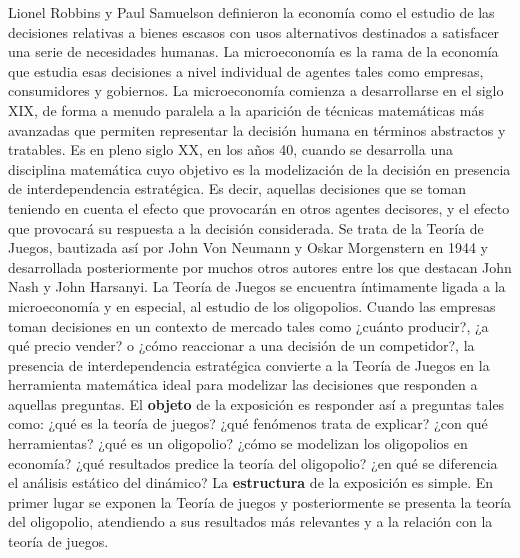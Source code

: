 \documentclass{nuevotema}
\begin{document}
\ideaclave

Lionel Robbins y Paul Samuelson definieron la economía como el estudio de las decisiones relativas a bienes escasos con usos alternativos destinados a satisfacer una serie de necesidades humanas. La microeconomía es la rama de la economía que estudia esas decisiones a nivel individual de agentes tales como empresas, consumidores y gobiernos. La microeconomía comienza a desarrollarse en el siglo XIX, de forma a menudo paralela a la aparición de técnicas matemáticas más avanzadas que permiten representar la decisión humana en términos abstractos y tratables. Es en pleno siglo XX, en los años 40, cuando se desarrolla una disciplina matemática cuyo objetivo es la modelización de la decisión en presencia de interdependencia estratégica. Es decir, aquellas decisiones que se toman teniendo en cuenta el efecto que provocarán en otros agentes decisores, y el efecto que provocará su respuesta a la decisión considerada. Se trata de la Teoría de Juegos, bautizada así por John Von Neumann y Oskar Morgenstern en 1944 y desarrollada posteriormente por muchos otros autores entre los que destacan John Nash y John Harsanyi. La Teoría de Juegos se encuentra íntimamente ligada a la microeconomía y en especial, al estudio de los oligopolios. Cuando las empresas toman decisiones en un contexto de mercado tales como ¿cuánto producir?, ¿a qué precio vender? o ¿cómo reaccionar a una decisión de un competidor?, la presencia de interdependencia estratégica convierte a la Teoría de Juegos en la herramienta matemática ideal para modelizar las decisiones que responden a aquellas preguntas. El \textbf{objeto} de la exposición es responder así a preguntas tales como: ¿qué es la teoría de juegos? ¿qué fenómenos trata de explicar? ¿con qué herramientas? ¿qué es un oligopolio? ¿cómo se modelizan los oligopolios en economía? ¿qué resultados predice la teoría del oligopolio? ¿en qué se diferencia el análisis estático del dinámico? La \textbf{estructura} de la exposición es simple. En primer lugar se exponen la Teoría de juegos y posteriormente se presenta la teoría del oligopolio, atendiendo a sus resultados más relevantes y a la relación con la teoría de juegos. 
\end{document}
